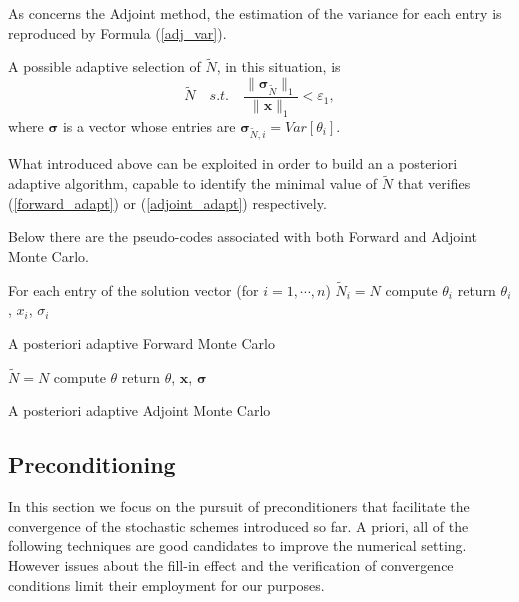 As concerns the Adjoint method, the estimation of the variance for each entry
is reproduced by Formula (\ref{adj_var}).

A possible adaptive selection of $\tilde{N}$, in this situation, is
\begin{equation}
\tilde{N} \quad s.t. \quad \frac{\lVert
\boldsymbol{\sigma}_{\tilde{N}}\rVert_1}{\lVert
\mathbf{x}\rVert_1}<\varepsilon_1,
\label{adjoint_adapt}
\end{equation}
where $\boldsymbol{\sigma}$ is a vector whose entries are
$\boldsymbol{\sigma}_{\tilde{N},i}=Var[\theta_i]$.

What introduced above can be exploited in order to build
an a posteriori adaptive algorithm, capable to identify the minimal value of
$\tilde{N}$ that verifies (\ref{forward_adapt}) or (\ref{adjoint_adapt})
respectively.

Below there are the pseudo-codes associated with both Forward and Adjoint Monte
Carlo.

\begin{algorithm}[H]
 For each entry of the solution vector (for $i=1,\cdots,n$) \;
 $\tilde{N}_i=N$\;
 compute $\theta_i$\;
 return $\theta_i$, $x_i$, $\sigma_i$\;
 \caption{A posteriori adaptive Forward Monte Carlo}
\end{algorithm}

\begin{algorithm}[H]
 $\tilde{N}=N$\;
 compute $\theta$\;
 return $\theta$, $\mathbf{x}$, $\boldsymbol{\sigma}$\;
 \caption{A posteriori adaptive Adjoint Monte Carlo}
\end{algorithm}

\subsection{Preconditioning}

In this section we focus on the pursuit of preconditioners that facilitate the
convergence of the stochastic schemes introduced so far. A priori, all of the
following techniques are good candidates to improve the numerical setting.
However issues about the fill-in effect and the verification of convergence
conditions limit their employment for our purposes.

